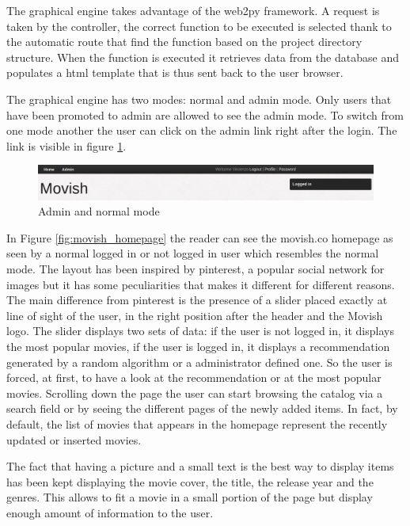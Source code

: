The graphical engine takes advantage of the web2py \cite{web2py} framework. A request is taken by the controller, the correct function to be executed is selected thank to the automatic route that find the function based on the project directory structure. When the function is executed it retrieves data from the database and populates a html template that is thus sent back to the user browser.

The graphical engine has two modes: normal and admin mode. Only users that have been promoted to admin are allowed to see the admin mode. To switch from one mode another the user can click on the admin link right after the login. The link is visible in figure \ref{fig:modes}. 

\begin{figure}
  \centering
  \includegraphics[width=\textwidth]{figures/admin_mode.png}
  \caption{Admin and normal mode}
  \label{fig:modes}
\end{figure}

In Figure \ref{fig:movish_homepage} the reader can see the movish.co homepage as seen by a normal logged in or not logged in user which resembles the normal mode.
The layout has been inspired by pinterest, a popular social network for images but it has some peculiarities that makes it different for different reasons. The main difference from pinterest is the presence of a slider placed exactly at line of sight of the user, in the right position after the header and the Movish logo. The slider displays two sets of data: if the user is not logged in, it displays the most popular movies, if the user is logged in, it displays a recommendation generated by a random algorithm or a administrator defined one. So the user is forced, at first, to have a look at the recommendation or at the most popular movies. Scrolling down the page the user can start browsing the catalog via a search field or by seeing the different pages of the newly added items. In fact, by default, the list of movies that appears in the homepage represent the recently updated or inserted movies.

The fact that having a picture and a small text is the best way to display items \cite{using-collaborative-filtering} has been kept displaying the movie cover, the title, the release year and the genres. This allows to fit a movie in a small portion of the page but display enough amount of information to the user. 

